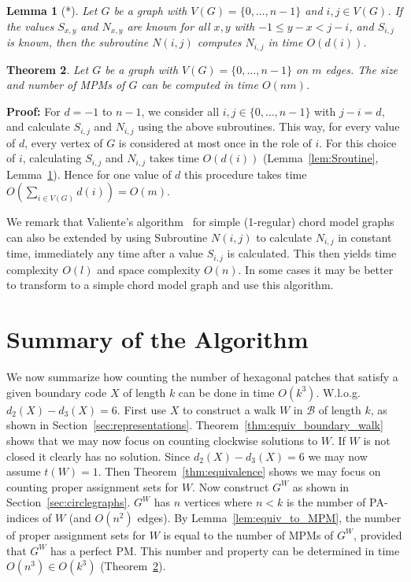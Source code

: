 \documentclass{llncs}
\newcommand{\PF}{{\bf Proof: }}
\newcommand{\QED}{\hspace*{\fill}{$\Box$}\medskip}
\newcommand{\BW}{\mathcal{B}}
\newcommand{\GPA}{G^{W}}
\newtheorem{thm}{Theorem}
\newtheorem{lem}[thm]{Lemma}
\begin{document}
\begin{lem}[*]
\label{lem:Nroutine}
Let $G$ be a graph with $V(G)=\{0,\ldots,n-1\}$ and $i,j\in V(G)$.
If the values $S_{x,y}$ and $N_{x,y}$ are known for all $x,y$ with $-1\leq y-x< j-i$, and $S_{i,j}$ is known,
then the subroutine $N(i,j)$ computes $N_{i,j}$ in time $O(d(i))$.
\end{lem}


\begin{thm}
\label{thm:MPM}
Let $G$ be a graph with $V(G)=\{0,\ldots,n-1\}$ on $m$ edges.
The size and number of MPMs of $G$ can be computed in time $O(nm)$.
\end{thm}
\PF
For $d=-1$ to $n-1$, we consider all $i,j\in \{0,\ldots,n-1\}$ with $j-i=d$, and calculate $S_{i,j}$ and $N_{i,j}$ using the above subroutines.
This way, for every value of $d$, every vertex of $G$ is considered at most once in the role of $i$. For this choice of $i$, calculating $S_{i,j}$ and $N_{i,j}$ takes time $O(d(i))$ (Lemma~\ref{lem:Sroutine}, Lemma~\ref{lem:Nroutine}).
Hence for one value of $d$ this procedure takes time $O(\sum_{i\in V(G)} d(i))=O(m)$.\QED



We remark that Valiente's algorithm~\cite{Val03} for simple (1-regular) chord model graphs can also be extended by using Subroutine $N(i,j)$ to calculate $N_{i,j}$ in constant time, immediately any time after a value $S_{i,j}$ is calculated. This then yields time complexity $O(l)$ and space complexity $O(n)$. In some cases it may be better to transform to a simple chord model graph and use this algorithm. 


\section{Summary of the Algorithm}
\label{sec:alg}

We now summarize how counting the number of hexagonal patches that satisfy a given boundary code $X$ of length $k$ can be done in time $O(k^3)$. 
W.l.o.g. $d_2(X)-d_3(X)=6$.
First use $X$ to construct a walk $W$ in $\BW$ of length $k$, as shown in Section~\ref{sec:representations}. Theorem~\ref{thm:equiv_boundary_walk} shows that we may now focus on counting clockwise solutions to $W$. If $W$ is not closed it clearly has no solution.
Since $d_2(X)-d_3(X)=6$ we may now assume $t(W)=1$. Then Theorem~\ref{thm:equivalence} shows we may focus on counting proper assignment sets for $W$. Now construct $\GPA$ as shown in Section~\ref{sec:circlegraphs}. $\GPA$ has $n$ vertices where $n<k$ is the number of PA-indices of $W$ (and $O(n^2)$ edges). By Lemma~\ref{lem:equiv_to_MPM}, the number of proper assignment sets for $W$ is equal to the number of MPMs of $\GPA$, provided that $\GPA$ has a perfect PM. This number and property can be determined in time $O(n^3)\in O(k^3)$ (Theorem~\ref{thm:MPM}).
\end{document}
